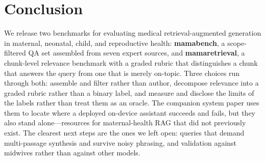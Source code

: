\section{Conclusion}
\label{sec:conclusion}

We release two benchmarks for evaluating medical retrieval-augmented generation
in maternal, neonatal, child, and reproductive health: \textbf{mamabench}, a
scope-filtered QA set assembled from seven expert sources, and
\textbf{mamaretrieval}, a
chunk-level relevance benchmark with a graded rubric that distinguishes a chunk
that answers the query from one that is merely on-topic. Three choices run
through both: assemble and filter rather than author, decompose relevance into a
graded rubric rather than a binary label, and measure and disclose the limits of
the labels rather than treat them as an oracle. The companion system paper uses
them to locate where a deployed on-device assistant succeeds and fails, but they
also stand alone---resources for maternal-health RAG that did not previously
exist. The
clearest next steps are the ones we left open: queries that demand multi-passage
synthesis and survive noisy phrasing, and validation against midwives rather
than against other models.
